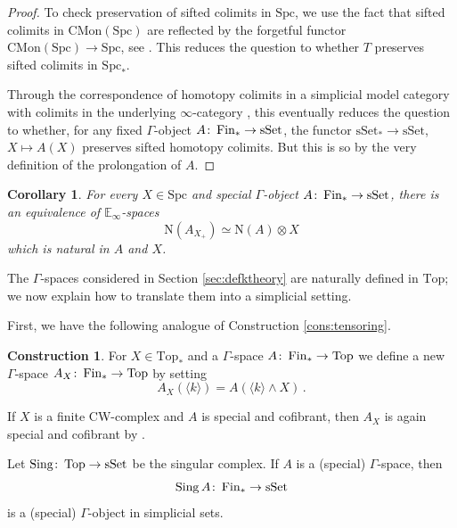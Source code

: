 \documentclass[oneside, a4paper, 12pt]{article}
\numberwithin{equation}{section}
\DeclareMathOperator{\Sing}{Sing}
\newcommand{\CMon}{\mathrm{CMon}}
\newcommand{\Spc}{\mathrm{Spc}}
\newcommand{\Topp}{\mathrm{Top}}
\newcommand{\Fin}{\mathrm{Fin}}
\newcommand{\sset}{\mathrm{sSet}}
\newcommand{\co}{\colon\thinspace}
\theoremstyle{plain}
\newtheorem{corollary}[theorem]{Corollary}
\theoremstyle{definition}
\newtheorem{construction}[theorem]{Construction}
\theoremstyle{remark}
\begin{document}
\begin{proof}
To check preservation of sifted colimits in $\Spc$, we use the fact that sifted colimits in $\CMon(\Spc)$ are reflected by the forgetful functor $\CMon(\Spc)\to \Spc$, see \cite[3.2.3.2]{HA}. This reduces the question to whether $T$ preserves sifted colimits in $\Spc_\ast$.

Through the correspondence of homotopy colimits in a simplicial model category with colimits in the underlying $\infty$-category \cite[4.2.4.1]{HTT}, this eventually reduces the question to whether, for any fixed $\Gamma$-object $A\co \Fin_\ast\to \sset$, the functor $\sset_\ast \to \sset$, $X\mapsto A(X)$ preserves sifted homotopy colimits. But this is so by the very definition of the prolongation of $A$.
\end{proof}



\begin{corollary} \label{cor:tensor}
For every $X\in \Spc$ and special $\Gamma$-object $A\co \Fin_\ast\to \sset$, there is an equivalence of $\mathbb{E}_\infty$-spaces
\[
\mathrm{N}(A_{X_+}) \simeq \mathrm{N} (A)\otimes X
\]
which is natural in $A$ and $X$.
\end{corollary}


The $\Gamma$-spaces considered in Section \ref{sec:defktheory} are naturally defined in $\Topp$; we now explain how to translate them into a simplicial setting. 

First, we have the following analogue of Construction \ref{cons:tensoring}.

\begin{construction} \label{cons:tensoring2}
For $X\in \Topp_\ast$ and a $\Gamma$-space $A\co \Fin_\ast\to \Topp$ we define a new $\Gamma$-space $A_X\co \Fin_\ast\to \Topp$ by setting
\[
A_X(\langle k\rangle)= A(\langle k \rangle \wedge X)\,.
\]
\end{construction}

If $X$ is a finite CW-complex and $A$ is special and cofibrant, then $A_X$ is again special and cofibrant by \cite[Proposition B.54]{Global}.


Let $\textnormal{Sing}\co \Topp\to\sset$ be the singular complex.  If $A$ is a (special) $\Gamma$-space, then
\[
\Sing A \co \Fin_\ast\to \sset
\]
is a (special) $\Gamma$-object in simplicial sets. 
\end{document}
